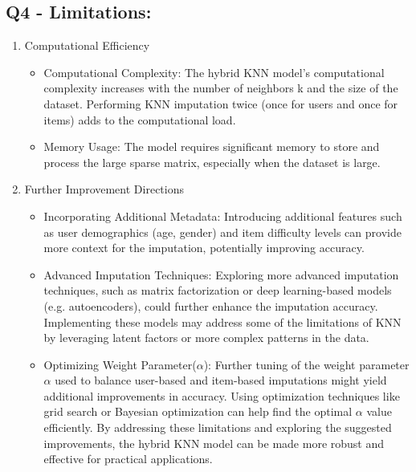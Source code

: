\documentclass{article}
\begin{document}
\subsection*{Q4 - Limitations:}
\begin{enumerate}
    \item Computational Efficiency
    \begin{itemize}
        \item Computational Complexity:\newline
        The hybrid KNN model's computational complexity increases with the number of neighbors k and the size of the dataset. Performing KNN imputation twice (once for users and once for items) adds to the computational load.
        \item Memory Usage:\newline
        The model requires significant memory to store and process the large sparse matrix, especially when the dataset is large.
    \end{itemize}
    \item Further Improvement Directions
    \begin{itemize}
        \item Incorporating Additional Metadata:\newline
        Introducing additional features such as user demographics (age, gender) and item difficulty levels can provide more context for the imputation, potentially improving accuracy.
        \item Advanced Imputation Techniques:\newline
        Exploring more advanced imputation techniques, such as matrix factorization or deep learning-based models (e.g. autoencoders), could further enhance the imputation accuracy. Implementing these models may address some of the limitations of KNN by leveraging latent factors or more complex patterns in the data.
        \item Optimizing Weight Parameter($\alpha$):\newline
        Further tuning of the weight parameter $\alpha$ used to balance user-based and item-based imputations might yield additional improvements in accuracy. Using optimization techniques like grid search or Bayesian optimization can help find the optimal $\alpha$ value efficiently.
        By addressing these limitations and exploring the suggested improvements, the hybrid KNN model can be made more robust and effective for practical applications.
    \end{itemize}
\end{enumerate}
\newpage
\end{document}
